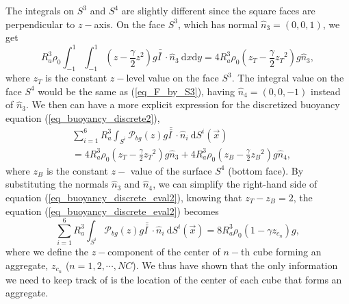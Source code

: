 \par
The integrals on $S^3$ and $S^4$ are slightly different since the square faces are perpendicular to $z-$axis. On the face $S^3$, which has normal $\hat{n}_3 = (0,0,1)$, we get
\begin{equation}
	R_a^3
\rho_0\int_{-1}^{1} \int_{-1}^{1}
  	\left( 
  	 z - \frac{\gamma}{2}{z}^2 
 	\right)g  \bar{\bar{I \ }}  \cdot
 	\hat{n}_3 \ 
	\textrm{d}x  \textrm{d}y 
	= 4 R_a^3 \rho_0 \left( z_T - \frac{\gamma}{2} {z_T}^{2} \right) g \hat{n}_3,
	\label{eq_F_by_S3}
\end{equation} 
where $z_T$ is the constant $z-$level value on the face $S^3$. The integral value on the face $S^4$ would be the same as (\ref{eq_F_by_S3}), having $\hat{n}_4 = (0,0,-1)$ instead of $\hat{n}_3$. We then can have a more explicit expression for the discretized buoyancy equation (\ref{eq_buoyancy_discrete2}),
\begin{align}
	& \sum_{i=1}^{6} R_a^3
	 \int_{S^i}
	 \mathcal{P}_{bg}(z) 
	  g \bar{\bar{I \ }}  \cdot
	\hat{n}_i \ \textrm{d}S^i (\vec{x})
	\nonumber 
	\\
	& = 4 R_a^3 \rho_0 \left( z_T - \frac{\gamma}{2} {z_T}^{2}  \right) g \hat{n}_3
	+ 4R_a^3 \rho_0 \left( z_B - \frac{\gamma}{2} {z_B}^{2}  \right) g \hat{n}_4,
\label{eq_buoyancy_discrete_eval2}
\end{align}
where $z_B$ is the constant $z-$ value of the surface $S^4$ (bottom face). By substituting the normals $\hat{n}_3$ and $\hat{n}_4$, we can simplify the right-hand side of equation (\ref{eq_buoyancy_discrete_eval2}), knowing that $z_T - z_B = 2$, the equation (\ref{eq_buoyancy_discrete_eval2}) becomes 
\begin{equation}
	\sum_{i=1}^{6} R_a^3
	\int_{S^i} 
	\mathcal{P}_{bg}(z) 
	g \bar{\bar{I \ }}  \cdot
   \hat{n}_i \ \textrm{d}S^i (\vec{x})
= 8 R_a^3 \rho_0 \left( 1 - \gamma z_{c_n} \right) g, 
\label{eq_buoyancy_z_eval2}
\end{equation}
where we define the $z-$component of the center of $n-$th cube forming an aggregate, $z_{c_n}$ ($ n = 1, 2, \cdots, NC$).
We thus have shown that the only information we need to keep track of is the location of the center of each cube that forms an aggregate.
%
